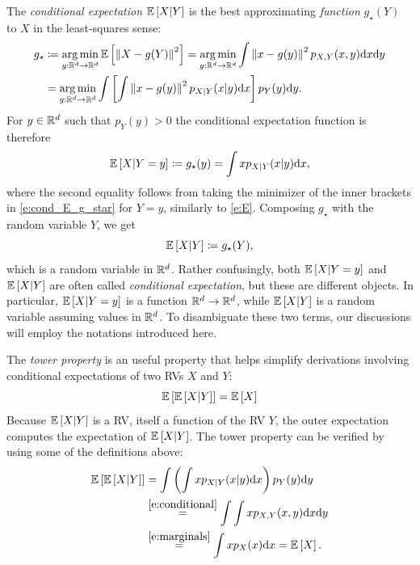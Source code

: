 The \emph{conditional expectation} $\mathbb{E}\left [X | Y\right ]$ is the best approximating \emph{function} $g_\star(Y)$ to $X$ in the least-squares sense: 
%
\begin{align}\nonumber
    g_\star &\coloneqq  \operatorname*{arg\,min}_{g:\mathbb R^d\rightarrow\mathbb R^d}\mathbb{E}\left [\left\Vert X-g(Y)\right\Vert^2\right ] =  \operatorname*{arg\,min}_{g:\mathbb R^d\rightarrow\mathbb R^d}\int \left\Vert x-g(y)\right\Vert^2 p_{X,Y}(x,y)\mathrm{d} x \mathrm{d} y \\ \label{e:cond_E_g_star}
    &= \operatorname*{arg\,min}_{g:\mathbb R^d\rightarrow\mathbb R^d} \int\left [\textcolor{black}{\int \left\Vert x-g(y)\right\Vert^2p_{X|Y}(x|y)\mathrm{d} x}\right ] p_Y(y)\mathrm{d} y.
\end{align}
%
For $y\in \mathbb R^d$ such that $p_Y(y)>0$ the conditional expectation function is therefore
%
\begin{equation}\label{e:cond_E_func}
    \E\brac{X|Y=y} \defe g_\star(y) = \int x p_{X|Y}(x|y) \dd x, %
\end{equation}
%
where the second equality follows from taking the minimizer of the inner brackets in \cref{e:cond_E_g_star} for $Y=y$, similarly to \cref{e:E}. 
%
Composing $g_\star$ with the random variable $Y$, we get 
%
\begin{equation}
    \E\brac{X|Y} \defe g_\star(Y), %
\end{equation}
%
which is a random variable in $\mathbb R^d$.
%
Rather confusingly, both $\mathbb{E}\left [X|Y=y\right ]$ and $\mathbb{E}\left [X|Y\right ]$ are often called \emph{conditional expectation}, but these are different objects.
%
In particular, $\mathbb{E}\left [X|Y=y\right ]$ is a function $\mathbb R^d\rightarrow\mathbb R^d$, while $\mathbb{E}\left [X|Y\right ]$ is a random variable assuming values in $\mathbb R^d$.
%
To disambiguate these two terms, our discussions will employ the notations introduced here. 

%

The \emph{tower property} is an useful property that helps simplify derivations involving conditional expectations of two RVs $X$ and $Y$:
%
\begin{equation}\label{e:tower}
    \E\brac{\E\brac{X|Y}} = \E\brac{X} %
\end{equation}
%
Because $\mathbb{E}\left [X|Y\right ]$ is a RV, itself a function of the RV $Y$, the outer expectation computes the expectation of $\mathbb{E}\left [X|Y\right ]$.
%
The tower property can be verified by using some of the definitions above: 
%
\begin{align*}
    \E\brac{\E\brac{X|Y}} &= \int \parr{\int x p_{X|Y}(x|y) \dd x} p_Y(y) \dd y \\
    &\overset{\eqref{e:conditional}}{=} \int \int x p_{X,Y}(x,y) \dd x\dd y \\
    &\overset{\eqref{e:marginals}}{=} \int x p_X(x)\dd x= \E \brac{X}.
\end{align*}

